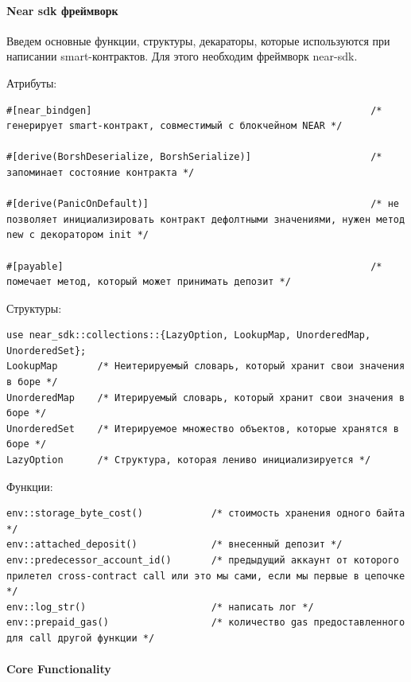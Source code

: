 \paragraph{Near sdk фреймворк}
Введем основные функции, структуры, декараторы, которые используются при написании smart-контрактов. Для этого необходим фреймворк near-sdk\cite{nearsdkrs}.

Атрибуты:
\begin{verbatim}
#[near_bindgen]                                                 /* генерирует smart-контракт, совместимый с блокчейном NEAR */

#[derive(BorshDeserialize, BorshSerialize)]                     /* запоминает состояние контракта */

#[derive(PanicOnDefault)]                                       /* не позволяет инициализировать контракт дефолтными значениями, нужен метод new с декоратором init */

#[payable]                                                      /* помечает метод, который может принимать депозит */
\end{verbatim}

Структуры:

\begin{verbatim}
use near_sdk::collections::{LazyOption, LookupMap, UnorderedMap, UnorderedSet};
LookupMap       /* Неитерируемый словарь, который хранит свои значения в боре */
UnorderedMap    /* Итерируемый словарь, который хранит свои значения в боре */
UnorderedSet    /* Итерируемое множество объектов, которые хранятся в боре */
LazyOption      /* Структура, которая лениво инициализируется */
\end{verbatim}

Функции:
\begin{verbatim}
env::storage_byte_cost()            /* стоимость хранения одного байта */
env::attached_deposit()             /* внесенный депозит */
env::predecessor_account_id()       /* предыдущий аккаунт от которого прилетел cross-contract call или это мы сами, если мы первые в цепочке */
env::log_str()                      /* написать лог */
env::prepaid_gas()                  /* количество gas предоставленного для call другой функции */
\end{verbatim}

\paragraph{Core Functionality}

